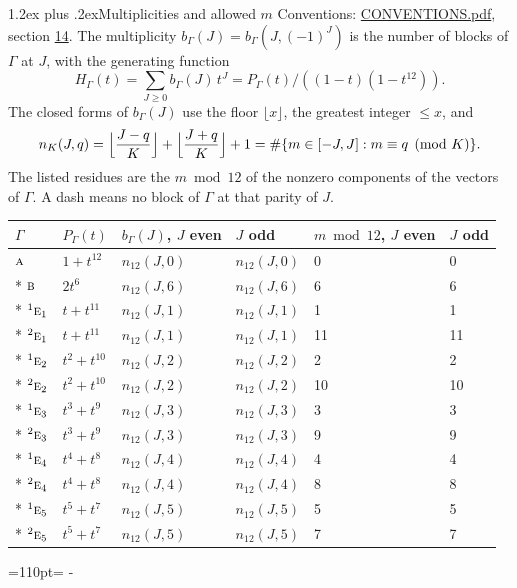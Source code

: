 \documentclass[10pt,a4paper]{article}
\makeatletter
\renewcommand\section{\@startsection{section}{1}{\z@}{-3ex plus -1ex minus -.2ex}%
  {1.2ex plus .2ex}{\normalfont\large\sffamily\bfseries\color{parttitle}}}
\newcommand{\needspace}[1]{\par\penalty-100\begingroup\dimen0=#1\relax\dimen2=\pagegoal
  \advance\dimen2-\pagetotal\ifdim\dimen0>\dimen2\relax\ifdim\dimen2>0pt\vfil\break\fi\fi
  \endgroup}
\numberwithin{equation}{section}
\newcommand{\irr}[1]{\text{\normalfont\scshape #1}}
\newcommand{\conjpair}[1]{{}^{#1}}
\makeatother
\begin{document}
\section{Multiplicities and allowed \texorpdfstring{$m$}{m}}\label{s:multiplicities}
Conventions: \href{../../CONVENTIONS.pdf}{CONVENTIONS.pdf}, section \href{../../CONVENTIONS.pdf\#conv.14}{14}.
\leavevmode\label{n:function.generating}\label{n:index.generating.variable}\label{n:function.generating.numerator}The multiplicity $b_\Gamma(J) = b_\Gamma(J, (-1)^J)$ is the number of blocks of $\Gamma$ at $J$, with the generating function
\begin{equation}\label{e:gf}H_\Gamma(t) = \sum_{J\ge0} b_\Gamma(J)\,t^J = P_\Gamma(t)/((1-t)(1-t^{12})).\end{equation}
\leavevmode\label{n:delimiter.floor}\label{n:local.floor.x}\label{n:function.count}\label{n:index.modulus.K}\label{n:index.residue}The closed forms of $b_\Gamma(J)$ use the floor $\lfloor x\rfloor$, the greatest integer $\le x$, and
\begin{equation}\label{e:count}n_K(J,q) = \Bigl\lfloor\frac{J-q}{K}\Bigr\rfloor + \Bigl\lfloor\frac{J+q}{K}\Bigr\rfloor + 1 = \#\{m\in[-J,J] : m\equiv q \pmod{K}\}.\end{equation}
\leavevmode\label{n:head.parity}The listed residues are the $m \bmod 12$ of the nonzero components of the vectors of $\Gamma$. A dash means no block of $\Gamma$ at that parity of $J$.
{\small\begin{longtable}{@{}llllll@{}}\toprule
$\Gamma$ & $P_\Gamma(t)$ & $b_\Gamma(J)$, $J$ even & $J$ odd & $m \bmod 12$, $J$ even & $J$ odd\\\midrule\endhead
\bottomrule\endfoot\endlastfoot
$\irr{a}$ & $1 + t^{12}$ & $n_{12}(J,0)$ & $n_{12}(J,0)$ & 0 & 0\\*
$\irr{b}$ & $2t^{6}$ & $n_{12}(J,6)$ & $n_{12}(J,6)$ & 6 & 6\\*
$\conjpair{1}\irr{e}_{1}$ & $t + t^{11}$ & $n_{12}(J,1)$ & $n_{12}(J,1)$ & 1 & 1\\*
$\conjpair{2}\irr{e}_{1}$ & $t + t^{11}$ & $n_{12}(J,1)$ & $n_{12}(J,1)$ & 11 & 11\\*
$\conjpair{1}\irr{e}_{2}$ & $t^{2} + t^{10}$ & $n_{12}(J,2)$ & $n_{12}(J,2)$ & 2 & 2\\*
$\conjpair{2}\irr{e}_{2}$ & $t^{2} + t^{10}$ & $n_{12}(J,2)$ & $n_{12}(J,2)$ & 10 & 10\\*
$\conjpair{1}\irr{e}_{3}$ & $t^{3} + t^{9}$ & $n_{12}(J,3)$ & $n_{12}(J,3)$ & 3 & 3\\*
$\conjpair{2}\irr{e}_{3}$ & $t^{3} + t^{9}$ & $n_{12}(J,3)$ & $n_{12}(J,3)$ & 9 & 9\\*
$\conjpair{1}\irr{e}_{4}$ & $t^{4} + t^{8}$ & $n_{12}(J,4)$ & $n_{12}(J,4)$ & 4 & 4\\*
$\conjpair{2}\irr{e}_{4}$ & $t^{4} + t^{8}$ & $n_{12}(J,4)$ & $n_{12}(J,4)$ & 8 & 8\\*
$\conjpair{1}\irr{e}_{5}$ & $t^{5} + t^{7}$ & $n_{12}(J,5)$ & $n_{12}(J,5)$ & 5 & 5\\*
$\conjpair{2}\irr{e}_{5}$ & $t^{5} + t^{7}$ & $n_{12}(J,5)$ & $n_{12}(J,5)$ & 7 & 7\\
\bottomrule\end{longtable}}
\needspace{110pt}
\end{document}
